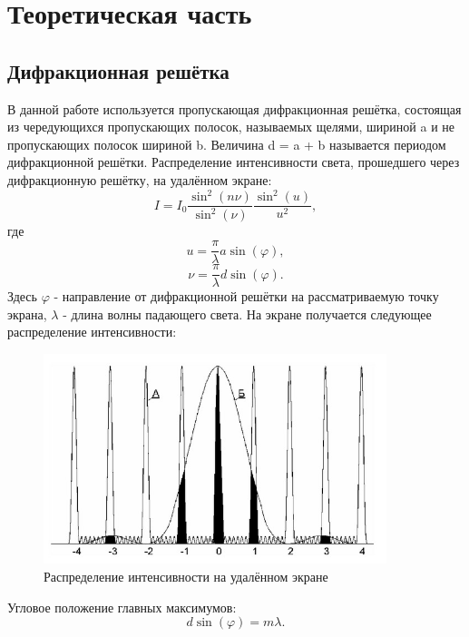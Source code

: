 \documentclass[
11pt,%
tightenlines,%
twoside,%
onecolumn,%
nofloats,%
nobibnotes,%
nofootinbib,%
superscriptaddress,%
noshowpacs,%
centertags]%
{revtex4}
\begin{document}
\section{Теоретическая часть}
\subsection{Дифракционная решётка}
В данной работе используется пропускающая дифракционная решётка, состоящая из чередующихся пропускающих
полосок, называемых щелями, шириной a и не пропускающих полосок шириной b. Величина d = a + b называется
периодом дифракционной решётки. Распределение интенсивности света, прошедшего через дифракционную
решётку, на удалённом экране:
\begin{equation}
    I = I_0 \frac{\sin^2(n\nu)}{\sin^2(\nu)}\frac{\sin^2(u)}{u^2},
\end{equation}  
где 
\begin{equation}
    u = \frac{\pi}{\lambda} a \sin(\varphi),
\end{equation}
\begin{equation}
    \nu = \frac{\pi}{\lambda} d \sin(\varphi).
\end{equation}
Здесь $\varphi$ - направление  от дифракционной решётки на рассматриваемую точку экрана, $\lambda$ - 
длина волны падающего света. 
На экране получается следующее распределение интенсивности:
\begin{figure}[h]
    \centering
    \includegraphics[width=10cm]{intensity.jpg}
    \caption{Распределение интенсивности на удалённом экране}
    \label{fig:1}
\end{figure}
\newline
Угловое положение главных максимумов:
\begin{equation}
    d\sin(\varphi) = m\lambda.
\end{equation}
\end{document}
